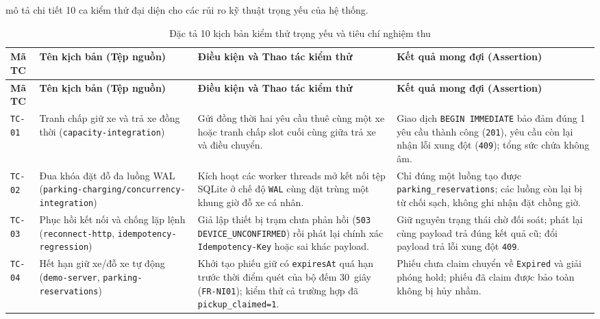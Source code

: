  mô tả chi tiết 10 ca kiểm thử đại diện cho các rủi ro kỹ thuật trọng yếu của hệ thống.

\begin{longtable}{>{\centering\arraybackslash}p{1.2cm} >{\raggedright\arraybackslash\small}p{4.1cm} >{\raggedright\arraybackslash}p{4.2cm} >{\raggedright\arraybackslash}p{4.8cm}}
\caption{Đặc tả 10 kịch bản kiểm thử trọng yếu và tiêu chí nghiệm thu} \label{tab:key-test-cases} \\
\toprule
\textbf{Mã TC} & \textbf{Tên kịch bản (Tệp nguồn)} & \textbf{Điều kiện và Thao tác kiểm thử} & \textbf{Kết quả mong đợi (Assertion)} \\
\midrule
\endfirsthead
\toprule
\textbf{Mã TC} & \textbf{Tên kịch bản (Tệp nguồn)} & \textbf{Điều kiện và Thao tác kiểm thử} & \textbf{Kết quả mong đợi (Assertion)} \\
\midrule
\endhead
\bottomrule
\endfoot
\texttt{TC-01} & Tranh chấp giữ xe và trả xe đồng thời (\texttt{capacity-integration}) & Gửi đồng thời hai yêu cầu thuê cùng một xe hoặc tranh chấp slot cuối cùng giữa trả xe và điều chuyển. & Giao dịch \texttt{BEGIN IMMEDIATE} bảo đảm đúng 1 yêu cầu thành công (\texttt{201}), yêu cầu còn lại nhận lỗi xung đột (\texttt{409}); tổng sức chứa không âm. \\
\midrule
\texttt{TC-02} & Đua khóa đặt đỗ đa luồng WAL (\texttt{parking-charging/\allowbreak concurrency-integration}) & Kích hoạt các worker threads mở kết nối tệp SQLite ở chế độ \texttt{WAL} cùng đặt trùng một khung giờ đỗ xe cá nhân. & Chỉ đúng một luồng tạo được \texttt{parking\_reservations}; các luồng còn lại bị từ chối sạch, không ghi nhận đặt chồng giờ. \\
\midrule
\texttt{TC-03} & Phục hồi kết nối và chống lặp lệnh (\texttt{reconnect-http}, \texttt{idempotency-regression}) & Giả lập thiết bị trạm chưa phản hồi (\texttt{503 DEVICE\_UNCONFIRMED}) rồi phát lại chính xác \texttt{Idempotency-Key} hoặc sai khác payload. & Giữ nguyên trạng thái chờ đối soát; phát lại cùng payload trả đúng kết quả cũ; đổi payload trả lỗi xung đột \texttt{409}. \\
\midrule
\texttt{TC-04} & Hết hạn giữ xe/đỗ xe tự động (\texttt{demo-server}, \texttt{parking-reservations}) & Khởi tạo phiếu giữ có \texttt{expiresAt} quá hạn trước thời điểm quét của bộ đếm 30~giây (\texttt{FR-NI01}); kiểm thử cả trường hợp đã \texttt{pickup\_claimed=1}. & Phiếu chưa claim chuyển về \texttt{Expired} và giải phóng hold; phiếu đã claim được bảo toàn không bị hủy nhầm. \\

\end{longtable}
